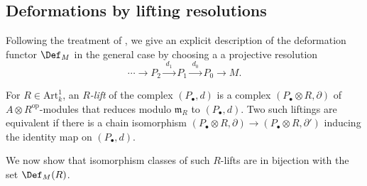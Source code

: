 \subsection{Deformations by lifting resolutions}
\label{subsubsec-defbylifting}
Following the treatment of \cite{eriksen_noncommutative_2017}, we give an
explicit description of the deformation functor \(\Def_M\) in the general case
by choosing a a projective resolution 
\[\cdots \rightarrow P_2 \xrightarrow{\;d_1\;} P_1 \xrightarrow{\;d_0\;} P_0
\rightarrow M.\]

\begin{definition} 
    For \(R\in \text{Art}^1_k\), an \textit{\(R\)-lift} of the complex
    \((P_\bullet, d)\) is a complex \((P_\bullet\otimes R, \partial)\) of
    \(A\otimes R^{\text{op}}\)-modules that reduces modulo \(\mathfrak{m}_R\) to
    \((P_\bullet, d)\).  Two such liftings are equivalent if there is a chain
    isomorphism \((P_\bullet\otimes R, \partial) \rightarrow (P_\bullet\otimes
    R, \partial')\) inducing the identity map on \((P_\bullet, d)\).
\end{definition}

We now show that isomorphism classes of such \(R\)-lifts are in bijection with
the set \(\Def_M(R)\).

